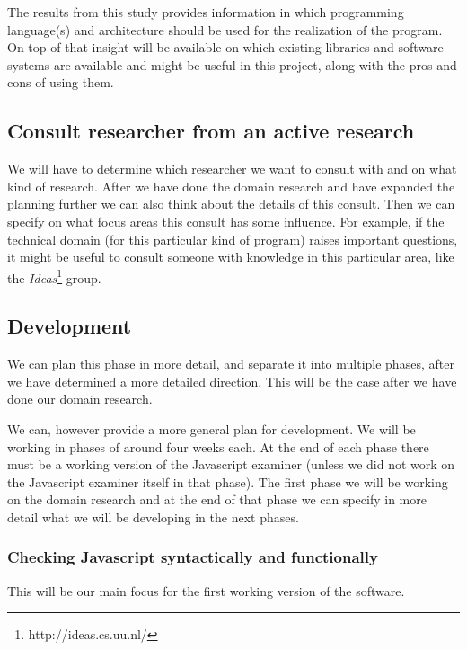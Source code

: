 \documentclass{article}
\begin{document}
The results from this study provides information in which programming
language(s) and architecture should be used for the realization of the
program. On top of that insight will be available on which existing libraries
and software systems are available and might be useful in this project, along
with the pros and cons of using them.

\subsection{Consult researcher from an active research}
We will have to determine which researcher we want to consult with and on what
kind of research. After we have done the domain research and have expanded the
planning further we can also think about the details of this consult. Then we
can specify on what focus areas this consult has some influence. For example,
if the technical domain (for this particular kind of program) raises important
questions, it might be useful to consult someone with knowledge in this
particular area, like the {\em Ideas}\footnote{http://ideas.cs.uu.nl/} group.

\subsection{Development}
We can plan this phase in more detail, and separate it into multiple phases,
after we have determined a more detailed direction. This will be the case after
we have done our domain research.

We can, however provide a more general plan for development. We will be working
in phases of around four weeks each. At the end of each phase there must be a
working version of the Javascript examiner (unless we did not work on the
Javascript examiner itself in that phase). The first phase we will be working
on the domain research and at the end of that phase we can specify in more
detail what we will be developing in the next phases.

\subsubsection{Checking Javascript syntactically and functionally}
This will be our main focus for the first working version of the software.
\end{document}
